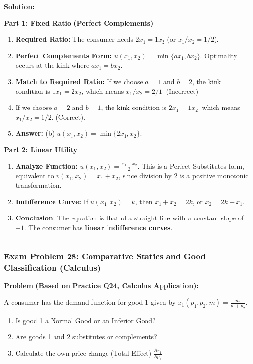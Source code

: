 \documentclass{article}
\begin{document}
\textbf{Solution:}

\textbf{Part 1: Fixed Ratio (Perfect Complements)}
\begin{enumerate}
    \item \textbf{Required Ratio:} The consumer needs $2x_1 = 1x_2$ (or $x_1/x_2 = 1/2$).
    \item \textbf{Perfect Complements Form:} $u(x_1, x_2) = \min\{a x_1, b x_2\}$. Optimality occurs at the kink where $a x_1 = b x_2$.
    \item \textbf{Match to Required Ratio:} If we choose $a=1$ and $b=2$, the kink condition is $1x_1 = 2x_2$, which means $x_1/x_2 = 2/1$. (Incorrect).
    \item If we choose $a=2$ and $b=1$, the kink condition is $2x_1 = 1x_2$, which means $x_1/x_2 = 1/2$. (Correct).
    \item \textbf{Answer:} (b) $u(x_1, x_2) = \min\{2x_1, x_2\}$.
\end{enumerate}

\textbf{Part 2: Linear Utility}
\begin{enumerate}
    \item \textbf{Analyze Function:} $u(x_1, x_2) = \frac{x_1 + x_2}{2}$. This is a Perfect Substitutes form, equivalent to $v(x_1, x_2) = x_1 + x_2$, since division by 2 is a positive monotonic transformation.
    \item \textbf{Indifference Curve:} If $u(x_1, x_2) = k$, then $x_1 + x_2 = 2k$, or $x_2 = 2k - x_1$.
    \item \textbf{Conclusion:} The equation is that of a straight line with a constant slope of $-1$. The consumer has \textbf{linear indifference curves}.
\end{enumerate}

\bigskip\hrule\bigskip

\subsubsection*{Exam Problem 28: Comparative Statics and Good Classification (Calculus)}

\textbf{Problem (Based on Practice Q24, Calculus Application):}

A consumer has the demand function for good 1 given by $x_1(p_1, p_2, m) = \frac{m}{p_1 + p_2}$.
\begin{enumerate}
    \item Is good 1 a Normal Good or an Inferior Good?
    \item Are goods 1 and 2 substitutes or complements?
    \item Calculate the own-price change (Total Effect) $\frac{\partial x_1}{\partial p_1}$.
\end{enumerate}
\end{document}
